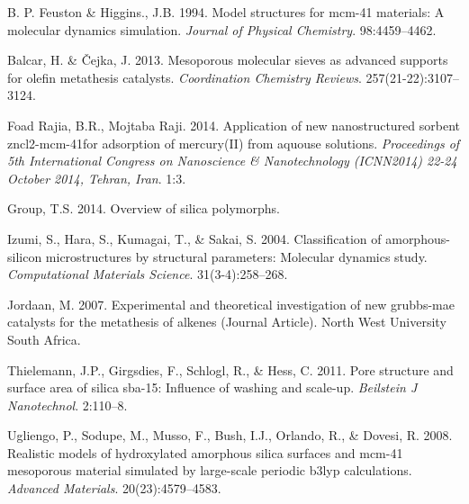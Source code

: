 \documentclass[]{article}
\begin{document}
\hypertarget{refs}{}
\leavevmode\hypertarget{ref-mcm41-1}{}%
B. P. Feuston \& Higgins., J.B. 1994. Model structures for mcm-41
materials: A molecular dynamics simulation. \emph{Journal of Physical
Chemistry}. 98:4459--4462.

\leavevmode\hypertarget{ref-RN44}{}%
Balcar, H. \& Čejka, J. 2013. Mesoporous molecular sieves as advanced
supports for olefin metathesis catalysts. \emph{Coordination Chemistry
Reviews}. 257(21-22):3107--3124.

\leavevmode\hypertarget{ref-xrd1}{}%
Foad Rajia, B.R., Mojtaba Raji. 2014. Application of new nanostructured
sorbent zncl2-mcm-41for adsorption of mercury(II) from aquouse
solutions. \emph{Proceedings of 5th International Congress on
Nanoscience \& Nanotechnology (ICNN2014) 22-24 October 2014, Tehran,
Iran}. 1:3.

\leavevmode\hypertarget{ref-Rep1}{}%
Group, T.S. 2014. Overview of silica polymorphs.

\leavevmode\hypertarget{ref-RN96}{}%
Izumi, S., Hara, S., Kumagai, T., \& Sakai, S. 2004. Classification of
amorphous-silicon microstructures by structural parameters: Molecular
dynamics study. \emph{Computational Materials Science}.
31(3-4):258--268.

\leavevmode\hypertarget{ref-RN88}{}%
Jordaan, M. 2007. Experimental and theoretical investigation of new
grubbs-mae catalysts for the metathesis of alkenes (Journal Article).
North West University South Africa.

\leavevmode\hypertarget{ref-RN92}{}%
Thielemann, J.P., Girgsdies, F., Schlogl, R., \& Hess, C. 2011. Pore
structure and surface area of silica sba-15: Influence of washing and
scale-up. \emph{Beilstein J Nanotechnol}. 2:110--8.

\leavevmode\hypertarget{ref-RN13}{}%
Ugliengo, P., Sodupe, M., Musso, F., Bush, I.J., Orlando, R., \& Dovesi,
R. 2008. Realistic models of hydroxylated amorphous silica surfaces and
mcm-41 mesoporous material simulated by large-scale periodic b3lyp
calculations. \emph{Advanced Materials}. 20(23):4579--4583.
\end{document}
